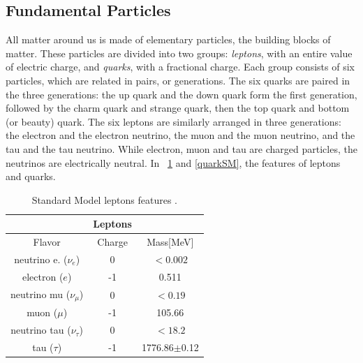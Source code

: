 \subsection{Fundamental Particles}
\label{cap1:pi}
All matter around us is made of elementary particles, the building blocks of matter. These particles are divided into two groups: \textit{leptons}, with an entire value of electric charge, and \textit{quarks}, with a fractional charge. Each group consists of six particles, which are related in pairs, or generations. The six quarks are paired in the three generations: the up quark and the down quark form the first generation, followed by the charm quark and strange quark, then the top quark and bottom (or beauty) quark.  The six leptons are similarly arranged in three generations: the electron and the electron neutrino, the muon and the muon neutrino, and the tau and the tau neutrino. While electron, muon and tau are charged particles, the neutrinos are electrically neutral. In \tablename~\ref{leptonsSM} and \ref{quarkSM}, the features of leptons and quarks.
\begin{table}[ht]	
	\begin{center}
		\begin{tabular}{|ccc|}
			\hline     & \textbf{Leptons} &   \\
			\hline   Flavor & Charge & Mass[MeV]  \\
			\hline
			\hline
			 neutrino e. ($\nu_{e}$) & 0 & $<0.002$   \\
			 electron ($e$) & -1 & 0.511   \\
			\hline
			 neutrino mu ($\nu_{\mu}$) & 0 & $<0.19$   \\
			 muon ($\mu$) & -1 & 105.66   \\
			\hline
			 neutrino tau ($\nu_{\tau}$) & 0 & $<18.2$ \\
			 tau ($\tau$) & -1 & 1776.86$\pm$0.12  \\
			\hline
			\hline
		\end{tabular}
	\end{center}
	\caption{Standard Model leptons features \cite{PDG}.}
	\label{leptonsSM}
\end{table}


